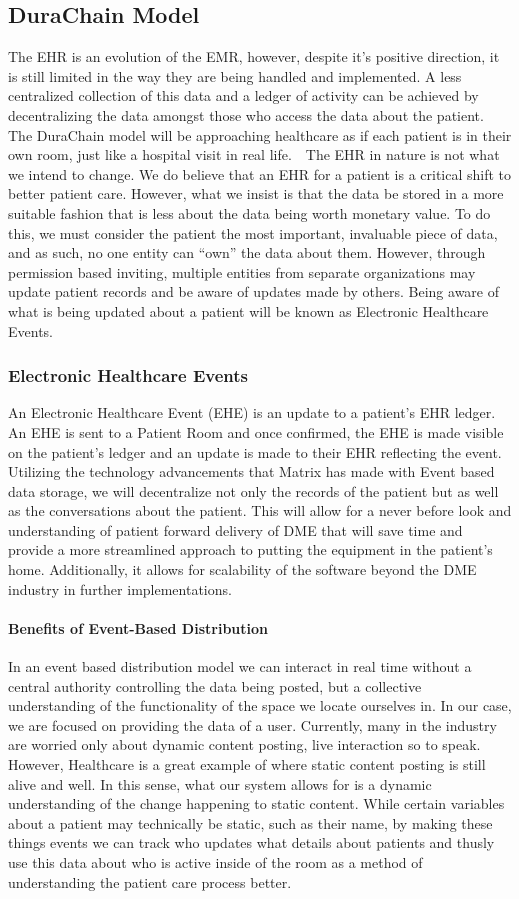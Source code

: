 \documentclass[letterpaper]{article}
\begin{document}
\subsection{DuraChain Model}
The EHR is an evolution of the EMR, however, despite it’s positive direction, it is still limited in the way they are being handled and implemented. A less centralized collection of this data and a ledger of activity can be achieved by decentralizing the data amongst those who access the data about the patient. The DuraChain model will be approaching healthcare as if each patient is in their own room, just like a hospital visit in real life.  
%
The EHR in nature is not what we intend to change. We do believe that an EHR for a patient is a critical shift to better patient care. However, what we insist is that the data be stored in a more suitable fashion that is less about the data being worth monetary value. To do this, we must consider the patient the most important, invaluable piece of data, and as such, no one entity can “own” the data about them. However, through permission based inviting, multiple entities from separate organizations may update patient records and be aware of updates made by others. Being aware of what is being updated about a patient will be known as Electronic Healthcare Events.
%
  \subsubsection{Electronic Healthcare Events}
  An Electronic Healthcare Event (EHE) is an update to a patient’s EHR ledger. An EHE is sent to a Patient Room and once confirmed, the EHE is made visible on the patient’s ledger and an update is made to their EHR reflecting the event.
%
  Utilizing the technology advancements that Matrix has made with Event based data storage, we will decentralize not only the records of the patient but as well as the conversations about the patient. This will allow for a never before look and understanding of patient forward delivery of DME that will save time and provide a more streamlined approach to putting the equipment in the patient's home. Additionally, it allows for scalability of the software beyond the DME industry in further implementations.
%
    \paragraph{Benefits of Event-Based Distribution}
    In an event based distribution model we can interact in real time without a central authority controlling the data being posted, but a collective understanding of the functionality of the space we locate ourselves in. In our case, we are focused on providing the data of a user. Currently, many in the industry are worried only about dynamic content posting, live interaction so to speak. However, Healthcare is a great example of where static content posting is still alive and well. In this sense, what our system allows for is a dynamic understanding of the change happening to static content. While certain variables about a patient may technically be static, such as their name, by making these things events we can track who updates what details about patients and thusly use this data about who is active inside of the room as a method of understanding the patient care process better.
%
\end{document}

